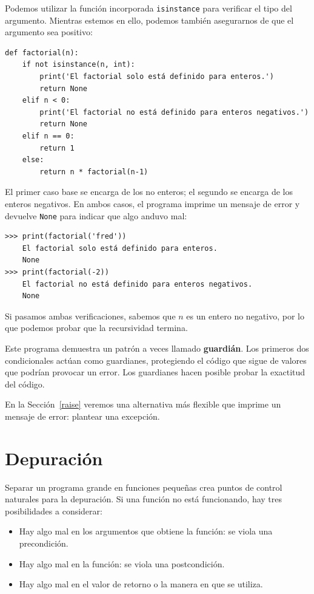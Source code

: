 \documentclass[10pt]{book}
\begin{document}
Podemos utilizar la función incorporada {\tt isinstance} para verificar el tipo
del argumento.  Mientras estemos en ello, podemos también asegurarnos de que el
argumento sea positivo:

\begin{verbatim}
def factorial(n):
    if not isinstance(n, int):
        print('El factorial solo está definido para enteros.')
        return None
    elif n < 0:
        print('El factorial no está definido para enteros negativos.')
        return None
    elif n == 0:
        return 1
    else:
        return n * factorial(n-1)
\end{verbatim}
%
El primer caso base se encarga de los no enteros; el
segundo se  encarga de los enteros negativos.  En ambos casos, el programa imprime
un mensaje de error y devuelve {\tt None} para indicar que algo
anduvo mal:

\begin{verbatim}
>>> print(factorial('fred'))
    El factorial solo está definido para enteros.
    None
>>> print(factorial(-2))
    El factorial no está definido para enteros negativos.
    None
\end{verbatim}
%
Si pasamos ambas verificaciones, sabemos que $n$ es un entero no negativo, por lo que podemos probar que la recursividad termina.

Este programa demuestra un patrón a veces llamado {\bf guardián}.
Los primeros dos condicionales actúan como guardianes, protegiendo el código que
sigue de valores que podrían provocar un error.  Los guardianes hacen
posible probar la exactitud del código.

En la Sección~\ref{raise} veremos una alternativa más flexible que imprime
un mensaje de error: plantear una excepción.


\section{Depuración}
\label{factdebug}

Separar un programa grande en funciones pequeñas crea puntos de control
naturales para la depuración.  Si una función no está
funcionando, hay tres posibilidades a considerar:

\begin{itemize}

\item Hay algo mal en los argumentos que obtiene
la función: se viola una precondición.

\item Hay algo mal en la función: se viola una
postcondición.

\item Hay algo mal en el valor de retorno o la
manera en que se utiliza.

\end{itemize}
\end{document}
